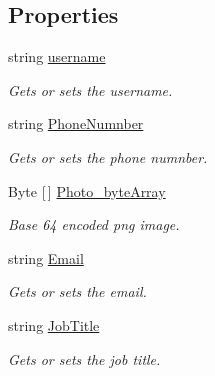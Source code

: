 \subsection*{Properties}
\begin{DoxyCompactItemize}
\item 
string \hyperlink{class_open_1_1_g_i_1_1hypermart_1_1_data_transformation_objects_1_1_user_d_t_o_a123512619de906f987a3da0b7ec32bb1}{username}
\begin{DoxyCompactList}\small\item\em Gets or sets the username. \end{DoxyCompactList}\item 
string \hyperlink{class_open_1_1_g_i_1_1hypermart_1_1_data_transformation_objects_1_1_user_d_t_o_a8ead06f70fbd3e0bcc72bf3aaae4fc9f}{Phone\+Numnber}
\begin{DoxyCompactList}\small\item\em Gets or sets the phone numnber. \end{DoxyCompactList}\item 
Byte \mbox{[}$\,$\mbox{]} \hyperlink{class_open_1_1_g_i_1_1hypermart_1_1_data_transformation_objects_1_1_user_d_t_o_a3e4447b4cd2ef861c95c1e9162cbceb1}{Photo\+\_\+byte\+Array}
\begin{DoxyCompactList}\small\item\em Base 64 encoded png image. \end{DoxyCompactList}\item 
string \hyperlink{class_open_1_1_g_i_1_1hypermart_1_1_data_transformation_objects_1_1_user_d_t_o_a96fdfcc9b2aa36fb35f6612b9e99b535}{Email}
\begin{DoxyCompactList}\small\item\em Gets or sets the email. \end{DoxyCompactList}\item 
string \hyperlink{class_open_1_1_g_i_1_1hypermart_1_1_data_transformation_objects_1_1_user_d_t_o_a7a436dea35ee6683f2f7f0c3e9551d08}{Job\+Title}
\begin{DoxyCompactList}\small\item\em Gets or sets the job title. \end{DoxyCompactList}\end{DoxyCompactItemize}


